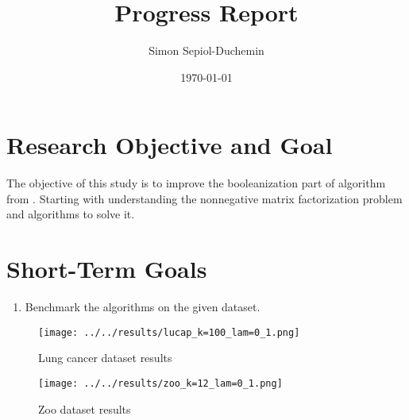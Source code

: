 \documentclass[a4paper,11pt]{article}
\title{Progress Report}
\author{Simon Sepiol-Duchemin}
\date{\today}
\begin{document}
%
\maketitle
\thispagestyle{empty}
%
\section{Research Objective and Goal}
The objective of this study is to improve the booleanization part of algorithm from \cite{9521203}. Starting with understanding the nonnegative matrix factorization problem and algorithms to solve it.
\section{Short-Term Goals}
\begin{enumerate}
\item Benchmark the algorithms on the given dataset.
\end{enumerate}



\begin{figure}[H]
    \centering
    \texttt{[image: ../../results/lucap\_k=100\_lam=0\_1.png]}
    \caption{Lung cancer dataset results}
\end{figure}
\begin{figure}[H]
    \centering
    \texttt{[image: ../../results/zoo\_k=12\_lam=0\_1.png]}
    \caption{Zoo dataset results}
\end{figure}




\end{document}

